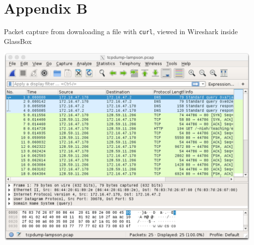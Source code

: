 \documentclass{proc}
\begin{document}
\section*{Appendix B}
\begin{minipage}[t]{\textwidth}
Packet capture from downloading a file with \texttt{curl}, viewed in Wireshark inside GlassBox
\end{minipage}
\includegraphics[scale=0.7]{wshark}
\clearpage
\end{document}
